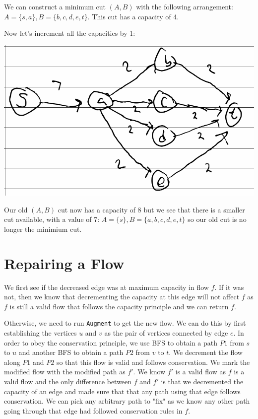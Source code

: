 \documentclass{article}
\begin{document}
We can construct a minimum cut $(A, B)$ with the following arrangement: $A = \{s, a\}, B = \{b, c, d, e, t\}$.
This cut has a capacity of 4.

Now let's increment all the capacities by 1:

\includegraphics[width=\textwidth]{2_2}

Our old $(A, B)$ cut now has a capacity of 8 but we see that there is a smaller cut available, with a value of 7: 
$A = \{s\}, B = \{a, b, c, d, e, t\}$ so our old cut is no longer the minimium cut.
\newpage

\section{Repairing a Flow}

We first see if the decreased edge was at maximum capacity in flow $f$. If it was not, then we know that decrementing the capacity at this edge will not affect $f$ as $f$ is still a valid flow that follows the capacity principle
and we can return $f$.

Otherwise, we need to run \texttt{Augment} to get the new flow. 
We can do this by first establishing the vertices $u$ and $v$ as the pair of vertices connected by edge $e$.
In order to obey the conservation principle, we use BFS to obtain a path $P1$ from $s$ to $u$ and another BFS to obtain a path $P2$ from $v$ to $t$.
We decrement the flow along $P1$ and $P2$ so that this flow is valid and follows conservation. 
We mark the modified flow with the modified path as $f'$. 
We know $f'$ is a valid flow as $f$ is a valid flow and the only difference between $f$ and $f'$ is that we decremented the capacity of an edge and made sure that that any path using that edge follows conservation.
We can pick any arbitrary path to "fix" as we know any other path going through that edge had followed conservation rules in $f$.
\end{document}
